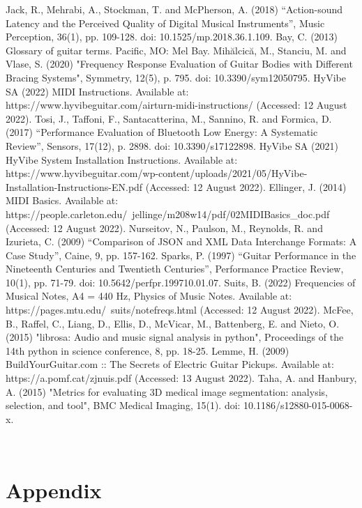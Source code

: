 \documentclass[conference]{IEEEtran}
\begin{document}
\begin{thebibliography}{00}
\bibitem{} Jack, R., Mehrabi, A., Stockman, T. and McPherson, A. (2018) ``Action-sound Latency and the Perceived Quality of Digital Musical Instruments'', Music Perception, 36(1), pp. 109-128. doi: 10.1525/mp.2018.36.1.109.
\bibitem{} Bay, C. (2013) Glossary of guitar terms. Pacific, MO: Mel Bay.
\bibitem Mihălcică, M., Stanciu, M. and Vlase, S. (2020) "Frequency Response Evaluation of Guitar Bodies with Different Bracing Systems", Symmetry, 12(5), p. 795. doi: 10.3390/sym12050795.
\bibitem{} HyVibe SA (2022) MIDI Instructions. Available at: https://www.hyvibeguitar.com/airturn-midi-instructions/ (Accessed: 12 August 2022).
\bibitem{} Tosi, J., Taffoni, F., Santacatterina, M., Sannino, R. and Formica, D. (2017) ``Performance Evaluation of Bluetooth Low Energy: A Systematic Review'', Sensors, 17(12), p. 2898. doi: 10.3390/s17122898.
\bibitem{} HyVibe SA (2021) HyVibe System Installation Instructions. Available at: https://www.hyvibeguitar.com/wp-content/uploads/2021/05/HyVibe-Installation-Instructions-EN.pdf (Accessed: 12 August 2022).
\bibitem{} Ellinger, J. (2014) MIDI Basics. Available at: https://people.carleton.edu/~jellinge/m208w14/pdf/02MIDIBasics\_doc.pdf (Accessed: 12 August 2022).
\bibitem{} Nurseitov, N., Paulson, M., Reynolds, R. and Izurieta, C. (2009) ``Comparison of JSON and XML Data Interchange Formats: A Case Study'', Caine, 9, pp. 157-162.
\bibitem{} Sparks, P. (1997) ``Guitar Performance in the Nineteenth Centuries and Twentieth Centuries'', Performance Practice Review, 10(1), pp. 71-79. doi: 10.5642/perfpr.199710.01.07.
\bibitem{} Suits, B. (2022) Frequencies of Musical Notes, A4 = 440 Hz, Physics of Music Notes. Available at: https://pages.mtu.edu/~suits/notefreqs.html (Accessed: 12 August 2022).
\bibitem{} McFee, B., Raffel, C., Liang, D., Ellis, D., McVicar, M., Battenberg, E. and Nieto, O. (2015) "librosa: Audio and music signal analysis in python", Proceedings of the 14th python in science conference, 8, pp. 18-25. 
\bibitem{} Lemme, H. (2009) BuildYourGuitar.com :: The Secrets of Electric Guitar Pickups. Available at: https://a.pomf.cat/zjnuis.pdf (Accessed: 13 August 2022).
\bibitem{} Taha, A. and Hanbury, A. (2015) "Metrics for evaluating 3D medical image segmentation: analysis, selection, and tool", BMC Medical Imaging, 15(1). doi: 10.1186/s12880-015-0068-x.

\end{thebibliography}
\vspace{12pt}
\newpage
~\newpage
\section{Appendix}
\end{document}
